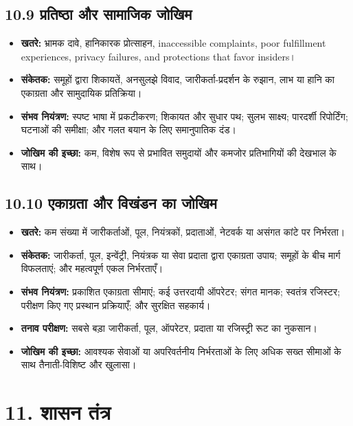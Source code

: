 \documentclass[11pt]{article}
\begin{document}
\subsection*{10.9 प्रतिष्ठा और सामाजिक जोखिम}

\begin{itemize}[leftmargin=*]
\item \textbf{खतरे:} भ्रामक दावे, हानिकारक प्रोत्साहन, inaccessible complaints, poor fulfillment experiences, privacy failures, and protections that favor insiders।
\item \textbf{संकेतक:} समूहों द्वारा शिकायतें, अनसुलझे विवाद, जारीकर्ता-प्रदर्शन के रुझान, लाभ या हानि का एकाग्रता और सामुदायिक प्रतिक्रिया।
\item \textbf{संभव नियंत्रण:} स्पष्ट भाषा में प्रकटीकरण; शिकायत और सुधार पथ; सुलभ साक्ष्य; पारदर्शी रिपोर्टिंग; घटनाओं की समीक्षा; और गलत बयान के लिए समानुपातिक दंड।
\item \textbf{जोखिम की इच्छा:} कम, विशेष रूप से प्रभावित समुदायों और कमजोर प्रतिभागियों की देखभाल के साथ।
\end{itemize}
\subsection*{10.10 एकाग्रता और विखंडन का जोखिम}

\begin{itemize}[leftmargin=*]
\item \textbf{खतरे:} कम संख्या में जारीकर्ताओं, पूल, नियंत्रकों, प्रदाताओं, नेटवर्क या असंगत कांटे पर निर्भरता।
\item \textbf{संकेतक:} जारीकर्ता, पूल, इन्वेंट्री, नियंत्रक या सेवा प्रदाता द्वारा एकाग्रता उपाय; समूहों के बीच मार्ग विफलताएं; और महत्वपूर्ण एकल निर्भरताएँ।
\item \textbf{संभव नियंत्रण:} प्रकाशित एकाग्रता सीमाएं; कई उत्तरदायी ऑपरेटर; संगत मानक; स्वतंत्र रजिस्टर; परीक्षण किए गए प्रस्थान प्रक्रियाएँ; और सुरक्षित सहकार्य।
\item \textbf{तनाव परीक्षण:} सबसे बड़ा जारीकर्ता, पूल, ऑपरेटर, प्रदाता या रजिस्ट्री रूट का नुकसान।
\item \textbf{जोखिम की इच्छा:} आवश्यक सेवाओं या अपरिवर्तनीय निर्भरताओं के लिए अधिक सख्त सीमाओं के साथ तैनाती-विशिष्ट और खुलासा।
\end{itemize}

\section*{11. शासन तंत्र}
\end{document}
